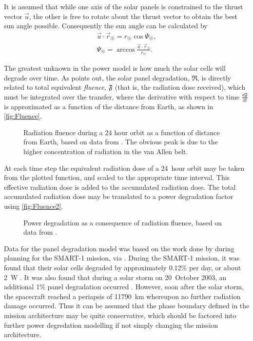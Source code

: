 It is assumed that while one axis of the solar panels is constrained to the thrust vector $\vec{u}$, the other is free to rotate about the thrust vector to obtain the best sun angle possible. Consequently the sun angle can be calculated by
\begin{subequations}
\begin{gather} \label{eq:sun-angle}
\vec{u}\cdot\vec{r}_\Sun = r_\Sun\cos\Psi_\Sun, \\
\Psi_\Sun = \arccos\frac{\vec{u}\cdot\vec{r}_\Sun}{r_\Sun}.
\end{gather}
\end{subequations}

The greatest unknown in the power model is how much the solar cells will degrade over time. As \textcite{Erb_thesis} points out, the solar panel degradation, $\mathfrak{R}$, is directly related to total equivalent \emph{fluence}, $\mathfrak{F}$ (that is, the radiation dose received), which must be integrated over the transfer, where the derivative with respect to time $\frac{d\mathfrak{F}}{dt}$ is approximated as a function of the distance from Earth, as shown in \autoref{fig:Fluence}. 

\begin{figure}
\centering
\def\svgwidth{\figurewidth}

\caption{Radiation fluence during a 24 hour orbit as a function of distance from Earth, based on data from \textcite{Erb_thesis}. The obvious peak is due to the higher concentration of radiation in the van Allen belt.} \label{fig:Fluence}
\end{figure}
  
At each time step the equivalent radiation dose of a 24~hour orbit may be taken from the plotted function, and scaled to the appropriate time interval. This effective radiation dose is added to the accumulated radiation dose. The total accumulated radiation dose may be translated to a power degradation factor using \autoref{fig:Fluence2}.

\begin{figure}
\centering
\def\svgwidth{\figurewidth}

\caption{Power degradation as a consequence of radiation fluence, based on data from \textcite{Erb_thesis}.} \label{fig:Fluence2}
\end{figure}

Data for the panel degradation model was based on the work done by \textcite{Hechler2002} during planning for the SMART-1 mission, via \textcite{Erb_thesis}. During the SMART-1 mission, it was found that their solar cells degraded by approximately 0.12\% per day, or about 2~W \parencite{Racca5}. It was also found that during a solar storm on 20~October 2003, an additional 1\% panel degradation occurred \parencite{Racca8}. However, soon after the solar storm, the spacecraft reached a periapsis of 11790~km whereupon no further radiation damage occurred. Thus it can be assumed that the phase boundary defined in the mission architecture may be quite conservative, which should be factored into further power degredation modelling if not simply changing the mission architecture.

